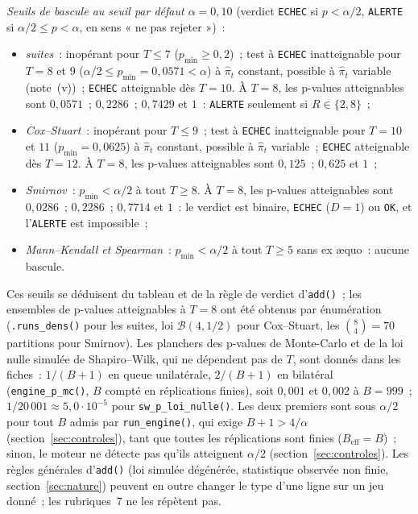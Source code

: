 \documentclass[a4paper,11pt]{article}
\newcommand{\code}[1]{\texttt{\small #1}}
\begin{document}
\noindent\emph{Seuils de bascule au seuil par défaut $\alpha = 0{,}10$} (verdict \code{ECHEC} si
$p < \alpha/2$, \code{ALERTE} si $\alpha/2 \le p < \alpha$, en sens « ne pas rejeter »)~:
\begin{itemize}[leftmargin=*, itemsep=1pt, topsep=2pt]
  \item \emph{suites}~: inopérant pour $T \le 7$ ($p_{\min} \ge 0{,}2$)~; test à \code{ECHEC}
  inatteignable pour $T = 8$ et $9$ ($\alpha/2 \le p_{\min} = 0{,}0571 < \alpha$) à $\hat\pi_t$
  constant, possible à $\hat\pi_t$ variable (note~(v))~; \code{ECHEC}
  atteignable dès $T = 10$. À $T = 8$, les p-values atteignables sont $0{,}0571$~; $0{,}2286$~;
  $0{,}7429$ et $1$~: \code{ALERTE} seulement si $R \in \{2, 8\}$~;
  \item \emph{Cox--Stuart}~: inopérant pour $T \le 9$~; test à \code{ECHEC} inatteignable pour
  $T = 10$ et $11$ ($p_{\min} = 0{,}0625$) à $\hat\pi_t$ constant, possible à $\hat\pi_t$
  variable~; \code{ECHEC} atteignable dès $T = 12$. À $T = 8$, les
  p-values atteignables sont $0{,}125$~; $0{,}625$ et $1$~;
  \item \emph{Smirnov}~: $p_{\min} < \alpha/2$ à tout $T \ge 8$. À $T = 8$, les p-values
  atteignables sont $0{,}0286$~; $0{,}2286$~; $0{,}7714$ et $1$~: le verdict est binaire,
  \code{ECHEC} ($D = 1$) ou \code{OK}, et l'\code{ALERTE} est impossible~;
  \item \emph{Mann--Kendall et Spearman}~: $p_{\min} < \alpha/2$ à tout $T \ge 5$ sans ex \ae quo~:
  aucune bascule.
\end{itemize}
Ces seuils se déduisent du tableau et de la règle de verdict d'\code{add()}~; les ensembles de
p-values atteignables à $T = 8$ ont été obtenus par énumération (\code{.runs\_dens()} pour les
suites, loi $\mathcal{B}(4, 1/2)$ pour Cox--Stuart, les $\binom{8}{4} = 70$ partitions pour
Smirnov). Les planchers des p-values de Monte-Carlo et de la loi nulle simulée de Shapiro--Wilk,
qui ne dépendent pas de $T$, sont donnés dans les fiches~: $1/(B+1)$ en queue unilatérale,
$2/(B+1)$ en bilatéral (\code{engine\_p\_mc()}, $B$ compté en réplications finies), soit
$0{,}001$ et $0{,}002$ à $B = 999$~; $1/20\,001 \approx 5{,}0\cdot 10^{-5}$ pour
\code{sw\_p\_loi\_nulle()}. Les deux premiers sont sous $\alpha/2$ pour tout $B$ admis par
\code{run\_engine()}, qui exige $B + 1 > 4/\alpha$ (section~\ref{sec:controles}), tant que
toutes les réplications sont finies ($B_{\text{eff}} = B$)~; sinon, le moteur ne détecte pas
qu'ils atteignent $\alpha/2$ (section~\ref{sec:controles}). Les règles générales d'\code{add()} (loi simulée dégénérée,
statistique observée non finie, section~\ref{sec:nature}) peuvent en outre changer le type d'une
ligne sur un jeu donné~; les rubriques~7 ne les répètent pas.
\end{document}

